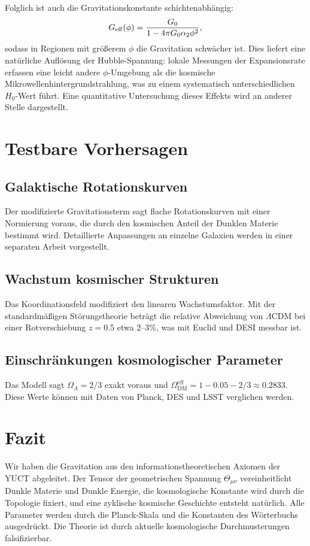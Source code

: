 \documentclass[12pt,a4paper]{article}
\begin{document}
	Folglich ist auch die Gravitationskonstante schichtenabhängig:
	\begin{equation}
		G_{\rm eff}(\phi) = \frac{G_0}{1-4\pi G_0\alpha_2\phi^2},
		\label{eq:Geff-layer}
	\end{equation}
	sodass in Regionen mit größerem \(\phi\) die Gravitation schwächer ist. Dies liefert eine natürliche Auflösung der Hubble-Spannung: lokale Messungen der Expansionsrate erfassen eine leicht andere \(\phi\)-Umgebung als die kosmische Mikrowellenhintergrundstrahlung, was zu einem systematisch unterschiedlichen \(H_0\)-Wert führt. Eine quantitative Untersuchung dieses Effekts wird an anderer Stelle dargestellt.
	
	\section{Testbare Vorhersagen}
	
	\subsection{Galaktische Rotationskurven}
	Der modifizierte Gravitationsterm sagt flache Rotationskurven mit einer Normierung voraus, die durch den kosmischen Anteil der Dunklen Materie bestimmt wird. Detaillierte Anpassungen an einzelne Galaxien werden in einer separaten Arbeit vorgestellt.
	
	\subsection{Wachstum kosmischer Strukturen}
	Das Koordinationsfeld modifiziert den linearen Wachstumsfaktor. Mit der standardmäßigen Störungstheorie beträgt die relative Abweichung von \(\Lambda\)CDM bei einer Rotverschiebung \(z=0.5\) etwa \(2\)–\(3\%\), was mit Euclid und DESI messbar ist.
	
	\subsection{Einschränkungen kosmologischer Parameter}
	Das Modell sagt \(\Omega_\Lambda = 2/3\) exakt voraus und \(\Omega_{\mathrm{DM}}^{\mathrm{eff}} = 1 - 0.05 - 2/3 \approx 0.2833\). Diese Werte können mit Daten von Planck, DES und LSST verglichen werden.
	
	\section{Fazit}
	Wir haben die Gravitation aus den informationstheoretischen Axiomen der YUCT abgeleitet. Der Tensor der geometrischen Spannung \(\Theta_{\mu\nu}\) vereinheitlicht Dunkle Materie und Dunkle Energie, die kosmologische Konstante wird durch die Topologie fixiert, und eine zyklische kosmische Geschichte entsteht natürlich. Alle Parameter werden durch die Planck-Skala und die Konstanten des Wörterbuchs ausgedrückt. Die Theorie ist durch aktuelle kosmologische Durchmusterungen falsifizierbar.
	
\end{document}

